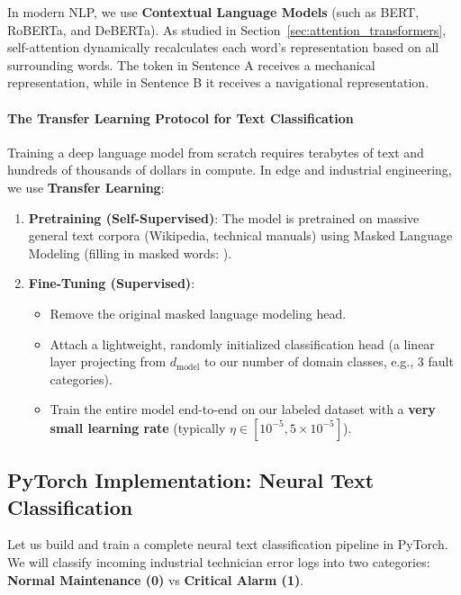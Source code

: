In modern NLP, we use \textbf{Contextual Language Models} (such as BERT, RoBERTa, and DeBERTa). As studied in Section~\ref{sec:attention_transformers}, self-attention dynamically recalculates each word's representation based on all surrounding words. The token  in Sentence A receives a mechanical representation, while in Sentence B it receives a navigational representation.

\paragraph{The Transfer Learning Protocol for Text Classification}
Training a deep language model from scratch requires terabytes of text and hundreds of thousands of dollars in compute. In edge and industrial engineering, we use \textbf{Transfer Learning}:
\begin{enumerate}
    \item \textbf{Pretraining (Self-Supervised)}: The model is pretrained on massive general text corpora (Wikipedia, technical manuals) using Masked Language Modeling (filling in masked words: ).
    \item \textbf{Fine-Tuning (Supervised)}:
    \begin{itemize}
        \item Remove the original masked language modeling head.
        \item Attach a lightweight, randomly initialized classification head (a linear layer projecting from $d_{\text{model}}$ to our number of domain classes, e.g., 3 fault categories).
        \item Train the entire model end-to-end on our labeled dataset with a \textbf{very small learning rate} (typically $\eta \in [10^{-5}, 5 \times 10^{-5}]$).
    \end{itemize}
\end{enumerate}

\subsection{PyTorch Implementation: Neural Text Classification}\label{subsec:pytorch_nlp}

Let us build and train a complete neural text classification pipeline in PyTorch. We will classify incoming industrial technician error logs into two categories: \textbf{Normal Maintenance (0)} vs \textbf{Critical Alarm (1)}.

